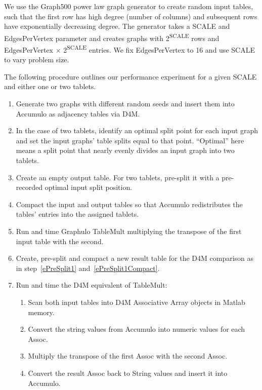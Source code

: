 We use the Graph500 power law graph generator \cite{bader2006designing} to create random input tables,
such that the first row has high degree (number of columns) 
and subsequent rows have exponentially decreasing degree.
The generator takes a SCALE and EdgesPerVertex parameter and creates graphs with 2\textsuperscript{SCALE} 
rows and EdgesPerVertex $\times$ 2\textsuperscript{SCALE} entries.
We fix EdgesPerVertex to 16 and use SCALE to vary problem size. 

The following procedure outlines our performance experiment for a given SCALE and either one or two tablets.
\begin{enumerate}
\item Generate two graphs with different random seeds and insert them into Accumulo as adjacency tables via D4M.
\item In the case of two tablets, identify an optimal split point for each input graph
and set the input graphs' table splits equal to that point.
``Optimal'' here means a split point that nearly evenly divides an input graph into two tablets.
\item \label{ePreSplit1} Create an empty output table. For two tablets, pre-split it with 
a pre-recorded optimal input split position.
\item \label{ePreSplit1Compact} Compact the input and output tables 
so that Accumulo redistributes the tables' entries into the assigned tablets.
\item Run and time Graphulo TableMult multiplying the transpose of the first input table with the second.
\item Create, pre-split and compact a new result table for the D4M comparison 
as in step~\ref{ePreSplit1} and~\ref{ePreSplit1Compact}.
\item Run and time the D4M equivalent of TableMult:
 \begin{enumerate}
 \item Scan both input tables into D4M Associative Array objects in Matlab memory.
 \item Convert the string values from Accumulo into numeric values for each Assoc.
 \item Multiply the transpose of the first Assoc with the second Assoc.
 \item Convert the result Assoc back to String values and insert it into Accumulo.
 \end{enumerate}
\end{enumerate}

